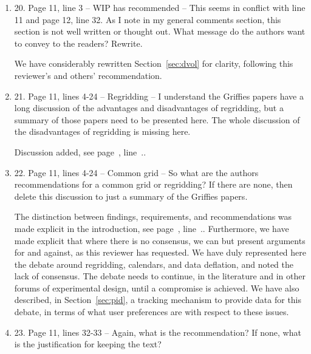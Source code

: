 \documentclass[gmd,manuscript]{copernicus}
\newcommand{\plref}[1]{see page~\pageref{p-#1}, line~\lineref{l-#1}.}
\newenvironment{answer}{\color{blue}}{}
\begin{document}
\begin{enumerate}[label=RC1-\arabic*,leftmargin=*]
  \begin{answer}
    Fixed, \plref{RC1-19}
  \end{answer}
\item 20. Page 11, line 3 -- WIP has recommended -- This seems in
  conflict with line 11 and page 12, line 32. As I note in my general
  comments section, this section is not well written or thought out.
  What message do the authors want to convey to the readers? Rewrite.

  \begin{answer}
    We have considerably rewritten Section~\ref{sec:dvol} for clarity,
    following this reviewer's and others' recommendation.
  \end{answer}
\item 21. Page 11, lines 4-24 -- Regridding -- I understand the Griffies
  papers have a long discussion of the advantages and disadvantages of
  regridding, but a summary of those papers need to be presented here.
  The whole discussion of the disadvantages of regridding is missing
  here.

  \begin{answer}
    Discussion added, \plref{RC3-14}.
  \end{answer}
\item 22. Page 11, lines 4-24 -- Common grid -- So what are the authors
  recommendations for a common grid or regridding? If there are none,
  then delete this discussion to just a summary of the Griffies
  papers.

  \begin{answer}
    The distinction between findings, requirements, and
    recommendations was made explicit in the introduction,
    \plref{RC1-Overview-2}. Furthermore, we have made explicit that
    where there is no consensus, we can but present arguments for and
    against, as this reviewer has requested. We have duly represented
    here the debate around regridding, calendars, and data deflation,
    and noted the lack of consensus. The debate needs to continue, in
    the literature and in other forums of experimental design, until a
    compromise is achieved. We have also described, in
    Section~\ref{sec:pid}, a tracking mechanism to provide data for
    this debate, in terms of what user preferences are with respect to
    these issues.
  \end{answer}
\item 23. Page 11, lines 32-33 -- Again, what is the recommendation? If
  none, what is the justification for keeping the text?


\end{enumerate}
\end{document}

